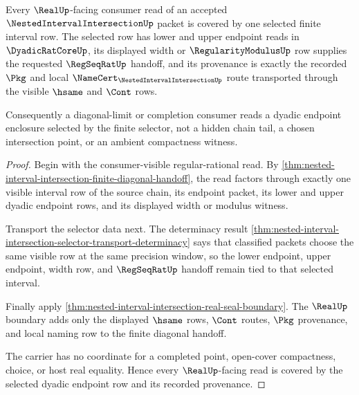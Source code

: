 \begin{theorem}
\label{thm:nested-interval-dyadic-selector-coverage}
Every $\RealUp$-facing consumer read of an accepted $\NestedIntervalIntersectionUp$ packet is covered by one selected finite interval row. The selected row has lower and upper endpoint reads in $\DyadicRatCoreUp$, its displayed width or $\RegularityModulusUp$ row supplies the requested $\RegSeqRatUp$ handoff, and its provenance is exactly the recorded $\Pkg$ and local $\NameCert_{\NestedIntervalIntersectionUp}$ route transported through the visible $\hsame$ and $\Cont$ rows.

Consequently a diagonal-limit or completion consumer reads a dyadic endpoint enclosure selected by the finite selector, not a hidden chain tail, a chosen intersection point, or an ambient compactness witness.
\end{theorem}
\begin{proof}
Begin with the consumer-visible regular-rational read. By \autoref{thm:nested-interval-intersection-finite-diagonal-handoff}, the read factors through exactly one visible interval row of the source chain, its endpoint packet, its lower and upper dyadic endpoint rows, and its displayed width or modulus witness.

Transport the selector data next. The determinacy result \autoref{thm:nested-interval-intersection-selector-transport-determinacy} says that classified packets choose the same visible row at the same precision window, so the lower endpoint, upper endpoint, width row, and $\RegSeqRatUp$ handoff remain tied to that selected interval.

Finally apply \autoref{thm:nested-interval-intersection-real-seal-boundary}. The $\RealUp$ boundary adds only the displayed $\hsame$ rows, $\Cont$ routes, $\Pkg$ provenance, and local naming row to the finite diagonal handoff.

The carrier has no coordinate for a completed point, open-cover compactness, choice, or host real equality. Hence every $\RealUp$-facing read is covered by the selected dyadic endpoint row and its recorded provenance.
\end{proof}

